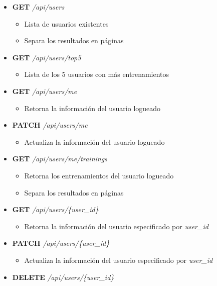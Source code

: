 \documentclass[12pt,a4paper,]{scrartcl}
\providecommand{\tightlist}{%
  \setlength{\itemsep}{0pt}\setlength{\parskip}{0pt}}
\begin{document}
\begin{itemize}
\tightlist
\item
  \textbf{GET} \emph{/api/users}

  \begin{itemize}
  \tightlist
  \item
    Lista de usuarios existentes
  \item
    Separa los resultados en páginas
  \end{itemize}
\item
  \textbf{GET} \emph{/api/users/top5}

  \begin{itemize}
  \tightlist
  \item
    Lista de los 5 usuarios con más entrenamientos
  \end{itemize}
\item
  \textbf{GET} \emph{/api/users/me}

  \begin{itemize}
  \tightlist
  \item
    Retorna la información del usuario logueado
  \end{itemize}
\item
  \textbf{PATCH} \emph{/api/users/me}

  \begin{itemize}
  \tightlist
  \item
    Actualiza la información del usuario logueado
  \end{itemize}
\item
  \textbf{GET} \emph{/api/users/me/trainings}

  \begin{itemize}
  \tightlist
  \item
    Retorna los entrenamientos del usuario logueado
  \item
    Separa los resultados en páginas
  \end{itemize}
\item
  \textbf{GET} \emph{/api/users/\{user\_id\}}

  \begin{itemize}
  \tightlist
  \item
    Retorna la información del usuario especificado por \emph{user\_id}
  \end{itemize}
\item
  \textbf{PATCH} \emph{/api/users/\{user\_id\}}

  \begin{itemize}
  \tightlist
  \item
    Actualiza la información del usuario especificado por \emph{user\_id}
  \end{itemize}
\item
  \textbf{DELETE} \emph{/api/users/\{user\_id\}}


\end{itemize}
\end{document}
